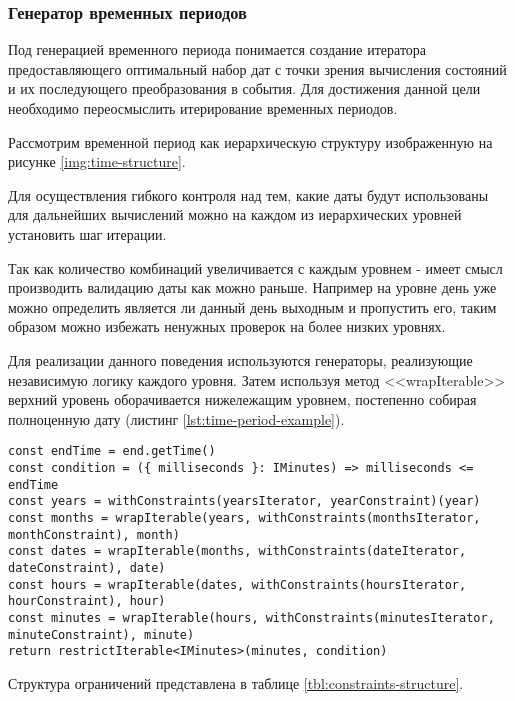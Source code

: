 \subsubsection{Генератор временных периодов}

Под генерацией временного периода понимается создание итератора предоставляющего оптимальный набор дат с точки зрения вычисления состояний и их последующего преобразования в события.
Для достижения данной цели необходимо переосмыслить итерирование временных периодов.

Рассмотрим временной период как иерархическую структуру изображенную на рисунке \ref{img:time-structure}.


Для осуществления гибкого контроля над тем, какие даты будут использованы для дальнейших вычислений можно на каждом из иерархических уровней установить шаг итерации.

Так как количество комбинаций увеличивается с каждым уровнем - имеет смысл производить валидацию даты как можно раньше.
Например на уровне день уже можно определить является ли данный день выходным и пропустить его, таким образом можно избежать ненужных проверок на более низких уровнях.

Для реализации данного поведения используются генераторы, реализующие независимую логику каждого уровня.
Затем используя метод <<wrapIterable>> верхний уровень оборачивается нижележащим уровнем, постепенно собирая полноценную дату (листинг \ref{lst:time-period-example}).

\begin{lstlisting}[caption={Процесс составления временного периода},label={lst:time-period-example}]
const endTime = end.getTime()
const condition = ({ milliseconds }: IMinutes) => milliseconds <= endTime
const years = withConstraints(yearsIterator, yearConstraint)(year)
const months = wrapIterable(years, withConstraints(monthsIterator, monthConstraint), month)
const dates = wrapIterable(months, withConstraints(dateIterator, dateConstraint), date)
const hours = wrapIterable(dates, withConstraints(hoursIterator, hourConstraint), hour)
const minutes = wrapIterable(hours, withConstraints(minutesIterator, minuteConstraint), minute)
return restrictIterable<IMinutes>(minutes, condition)
\end{lstlisting}

Структура ограничений представлена в таблице \ref{tbl:constraints-structure}.

